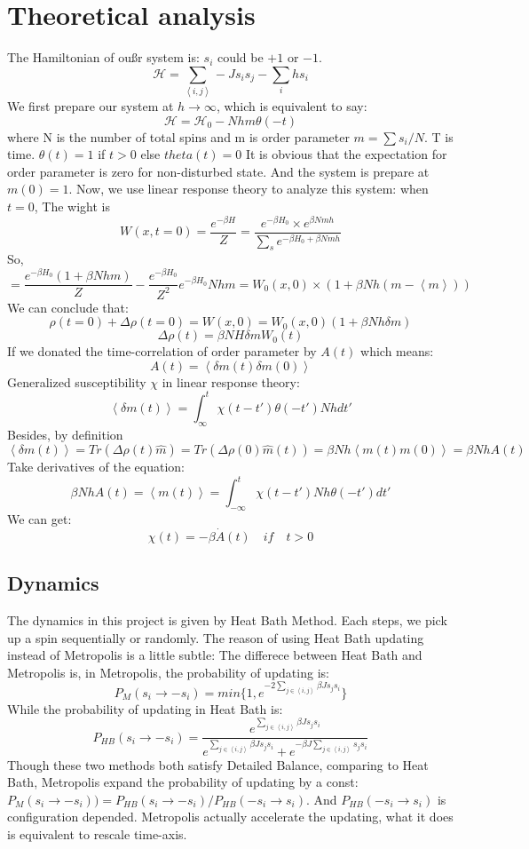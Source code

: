 \documentclass[a4paper]{article}
\begin{document}
\section{Theoretical analysis}
The Hamiltonian of oußr system is: $s_i$ could be $+1$ or $-1$.
$$\mathcal{H}=\sum_{\left\langle i,j\right\rangle}-Js_is_j-\sum_ihs_i$$
We first prepare our system at $h\rightarrow\infty$, which is equivalent to say:
$$\mathcal{H} = \mathcal{H}_0-Nhm\theta(-t)$$
where N is the number of total spins and m is order parameter $m=\sum s_i/N$. T is time. $\theta(t)=1$ if $t>0$ else $theta(t)=0$
It is obvious that the expectation for order parameter is zero for non-disturbed state.
And the system is prepare at $m(0)=1$.\newline
Now, we use linear response theory to analyze this system: when $t=0$, The wight is 
$$W(x,t=0) = \frac{e^{-\beta H}}{Z}=\frac{e^{-\beta H_0}\times e^{\beta Nmh}}{\sum_{s}e^{-\beta H_0+\beta Nmh}}$$
So,
$$=\frac{e^{-\beta H_0}(1+\beta Nhm)}{Z}-\frac{e^{-\beta H_0}}{Z^2}e^{-\beta H_0}Nhm=W_0(x,0)\times(1+\beta Nh(m-\left\langle m\right\rangle))$$
We can conclude that:
$$\rho(t=0)+\Delta\rho(t=0)=W(x,0)=W_0(x,0)(1+\beta Nh\delta m) $$
$$\Delta\rho(t) = \beta NH\delta mW_0(t)$$
If we donated the time-correlation of order parameter by $A(t)$ which means:
$$A(t)=\left\langle\delta m(t)\delta m(0)\right\rangle$$
Generalized susceptibility $\chi$ in linear response theory:
$$\left\langle \delta m(t)\right\rangle=\int_{\infty}^{t}\chi(t-t')\theta(-t')Nhdt'$$
Besides, by definition
$$\left\langle \delta m(t)\right\rangle=Tr(\Delta\rho(t)\hat{m})=Tr(\Delta\rho(0)\hat{m}(t))=\beta Nh \left\langle m(t)m(0)\right\rangle=\beta NhA(t)$$
Take derivatives of the equation:
$$\beta NhA(t)=\left\langle m(t)\right\rangle=\int_{-\infty}^{t}\chi(t-t')Nh\theta(-t')dt'$$
We can get:
$$\chi(t)= -\beta\dot{A}(t)\quad if\quad t>0$$

\subsection{Dynamics}
The dynamics in this project is given by Heat Bath Method. Each steps, we pick up a spin sequentially or randomly.
The reason of using Heat Bath updating instead of Metropolis is a little subtle:
The differece between Heat Bath and Metropolis is, in Metropolis, the probability of updating is:
$$P_M(s_i\rightarrow -s_i)=min\{1,e^{-2\sum_{j \in \left\langle i,j \right\rangle}\beta Js_js_i}\}$$
While the probability of updating in Heat Bath is:
$$P_{HB}(s_i\rightarrow -s_i)=\frac{e^{\sum_{j \in \left\langle i,j \right\rangle}\beta Js_js_i}}{e^{\sum_{j \in \left\langle i,j \right\rangle}\beta Js_js_i}+e^{-\beta J\sum_{j \in \left\langle i,j \right\rangle}s_js_i}}$$
Though these two methods both satisfy Detailed Balance, comparing to Heat Bath, Metropolis expand the probability of 
updating by a const: $P_M(s_i\rightarrow -s_i))=P_{HB}(s_i\rightarrow -s_i)/P_{HB}(-s_i\rightarrow s_i)$. 
And $P_{HB}(-s_i\rightarrow s_i)$ is configuration depended. Metropolis actually accelerate the updating, what it does 
is equivalent to rescale time-axis.




% 
\end{document}
